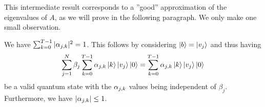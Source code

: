 This intermediate result corresponds to a ''good'' approximation of the eigenvalues of \(A\), as we will prove in the following paragraph. We only make one small observation.

\begin{observation} \label{basic_alpha_bound_and_alphas_are_prob_distr}
    We have \(\sum_{k=0}^{T-1} |\alpha_{j, k}|^2 = 1\). This follows by considering \(\ket{b} = \ket{v_j}\) and thus having
    \begin{align}
        \sum_{j=1}^N \beta_j \sum_{k=0}^{T-1} \alpha_{j, k} \ket{k}\ket{v_j}\ket{0} = \sum_{k=0}^{T-1} \alpha_{j, k} \ket{k}\ket{v_j}\ket{0}
    \end{align}
    be a valid quantum state with the \(\alpha_{j, k}\) values being independent of \(\beta_j\). Furthermore, we have \(|\alpha_{j, k}| \leq 1\).
\end{observation}

